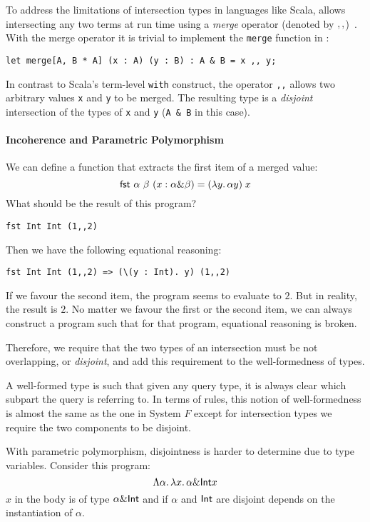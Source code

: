 To address the limitations of intersection types in languages like
Scala, \name allows intersecting any two terms at run time using a
\emph{merge} operator (denoted by $ ,, $)~\cite{dunfield2014elaborating}.  With the merge
operator it is trivial to implement the \lstinline{merge} function in \name:

\begin{lstlisting}
let merge[A, B * A] (x : A) (y : B) : A & B = x ,, y;
\end{lstlisting}

\noindent In contrast to Scala's term-level \lstinline{with}
construct, the operator \lstinline{,,} allows two arbitrary values \lstinline{x}
and \lstinline{y} to be merged. The resulting type is a \emph{disjoint}
intersection of the types of  \lstinline{x}
and \lstinline{y} (\lstinline{A & B} in this case).



\paragraph{Incoherence and Parametric Polymorphism}
We can define a  function that extracts the first item of a merged value:
\[
\textsf{fst} \ \alpha \ \beta \ (x : \alpha \& \beta) = (\lambda y.\, \alpha y) \; x
\]
What should be the result of this program?
\begin{lstlisting}
fst Int Int (1,,2)
\end{lstlisting}

Then we have the following equational reasoning:
\begin{lstlisting}
fst Int Int (1,,2) => (\(y : Int). y) (1,,2)
\end{lstlisting}
If we favour the second item, the program seems to evaluate to $2$. But in
reality, the result is $2$. No matter we favour the first or the second item,
we can always construct a program such that for that program, equational
reasoning is broken.

Therefore, we require that the two types of an intersection must be not
overlapping, or \emph{disjoint}, and add this requirement to the well-formedness of types.

A well-formed type is such that given any query type,
it is always clear which subpart the query is referring to.
In terms of rules, this notion of well-formedness is almost the same as the one in System $F$
except for intersection types we require the two components to be disjoint.

With parametric polymorphism, disjointness is harder to determine due to type variables.
Consider this program:
\[
\Lambda \alpha.\, \lambda x.\, \alpha \& \textsf{Int} x
\]
$x$ in the body is of type $\alpha \& \textsf{Int}$ and if $\alpha$ and $\textsf{Int}$ are
disjoint depends on the instantiation of $\alpha$.

